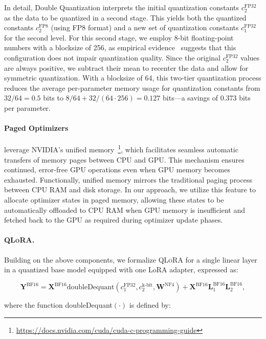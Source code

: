 In detail, Double Quantization interprets the initial quantization constants $c_2^{\text{FP32}}$ as the data to be quantized in a second stage. This yields both the quantized constants $c_2^{\text{FP8}}$ (using FP8 format) and a new set of quantization constants $c_1^{\text{FP32}}$ for the second level. For this second stage, we employ 8-bit floating-point numbers with a blocksize of 256, as empirical evidence~\citep{dettmers2022case} suggests that this configuration does not impair quantization quality. Since the original $c_2^{\text{FP32}}$ values are always positive, we subtract their mean to recenter the data and allow for symmetric quantization. With a blocksize of 64, this two-tier quantization process reduces the average per-parameter memory usage for quantization constants from $32/64=0.5$ bits to $8/64 + 32/(64\cdot256) = 0.127$ bits—a savings of 0.373 bits per parameter.

\paragraph{Paged Optimizers} leverage NVIDIA's unified memory~\footnote{\tiny \url{https://docs.nvidia.com/cuda/cuda-c-programming-guide}}, which facilitates seamless automatic transfers of memory pages between CPU and GPU. This mechanism ensures continued, error-free GPU operations even when GPU memory becomes exhausted. Functionally, unified memory mirrors the traditional paging process between CPU RAM and disk storage. In our approach, we utilize this feature to allocate optimizer states in paged memory, allowing these states to be automatically offloaded to CPU RAM when GPU memory is insufficient and fetched back to the GPU as required during optimizer update phases.

\paragraph{\textsc{QLoRA}.} Building on the above components, we formalize \textsc{QLoRA} for a single linear layer in a quantized base model equipped with one LoRA adapter, expressed as:

\begin{equation}
    \mathbf{Y}^{\text{BF16}} =  \mathbf{X}^{\text{BF16}} \text{doubleDequant}(c_1^{\text{FP32}}, c_2^{\text{k-bit}}, \mathbf{W}^{\text{NF4}}) + \mathbf{X}^{\text{BF16}}\mathbf{L}^{\text{BF16}}_1\mathbf{L}^{\text{BF16}}_2,
\end{equation}

where the function doubleDequant$(\cdot)$ is defined by:

